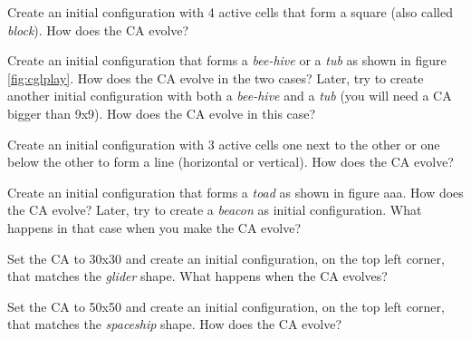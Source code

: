 \begin{problem}
\label{prob:cgl1}
Create an initial configuration with 4 active cells that form a square (also called \textit{block}).
How does the CA evolve?
\end{problem}

\begin{problem}
\label{prob:cgl2}
Create an initial configuration that forms a \textit{bee-hive} or
a \textit{tub} as shown in figure \ref{fig:cglplay}.
How does the CA evolve in the two cases?
Later, try to create another initial configuration with both a
\textit{bee-hive} and a \textit{tub} (you will need a CA bigger than 9x9).
How does the CA evolve in this case?
\end{problem}

\begin{problem}
\label{prob:cgl3}
Create an initial configuration with 3 active cells one next to the other or one
below the other to form a line (horizontal or vertical).
How does the CA evolve?
\end{problem}

\begin{problem}
\label{prob:cgl4}
Create an initial configuration that forms a \textit{toad} as shown in figure aaa.
How does the CA evolve?
Later, try to create a \textit{beacon} as initial configuration. What happens in that
case when you make the CA evolve?
\end{problem}

\begin{problem}
\label{prob:cgl5}
Set the CA to 30x30 and create an initial configuration, on the top left corner, that
matches the \textit{glider} shape. What happens when the CA evolves?
\end{problem}

\begin{problem}
\label{prob:cgl6}
Set the CA to 50x50 and create an initial configuration, on the top left corner, that
matches the \textit{spaceship} shape. How does the CA evolve?
\end{problem}

